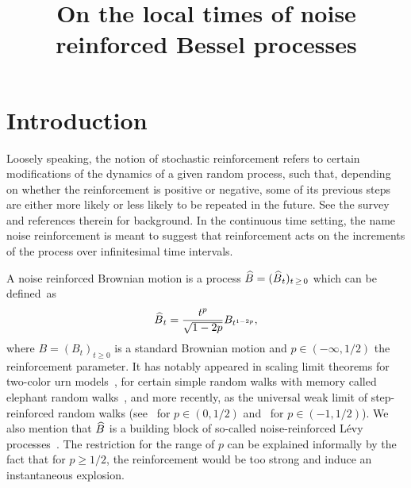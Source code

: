 \documentclass[AHL,Unicode,longabstracts,published]{cedram}
\title[Local time of a noise reinforced Bessel process]{On the local times of noise reinforced Bessel processes}
\author[\initial{J.} \lastname{Bertoin}]{\firstname{Jean} \lastname{Bertoin}}
\renewcommand{\hat}[1]{\widehat{#1}}
\let\oldhat\hat
\renewcommand*{\hat}[1]{\mathchoice{\widehat{#1}}{\widehat{#1}}{\oldhat{#1}}{\oldhat{#1}}}
\begin{document}
\maketitle


\section{Introduction}\label{sec:introduction}
Loosely speaking, the notion of stochastic reinforcement refers to certain modifications of the dynamics of a given random process, such that, depending on whether the reinforcement is positive or negative, some of its previous steps are either more likely or less likely to be repeated in the future. See the survey~\cite{Pem} and references therein for background. In the continuous time setting, the name noise reinforcement is meant to suggest that reinforcement acts on the increments of the process over infinitesimal time intervals.

A noise reinforced Brownian motion is a process $\hat B=(\hat B_t)_{t\,\geq\,0}$ which can be defined~as
\[
\hat B_t = \frac{t^{p}}{\sqrt{1-2p}}{B_{t^{1-2p}}},
\]
where $B=(B_t)_{t\geq 0}$ is a standard Brownian motion and $p\in(-\infty,1/2)$ the reinforcement parameter. It has notably appeared in scaling limit theorems for two-color urn models~\cite{BHZ,Gouet}, for certain simple random walks with memory called elephant random walks~\cite{BaurBer,ColGavSch2}, and more recently, as the universal weak limit of step-reinforced random walks (see~\cite{BerVla} for $p\in(0,1/2)$ and~\cite{BerRos} for $p\in(-1,1/2)$). We also mention that $\hat B$ is a building block of so-called noise-reinforced Lévy processes~\cite{NRLP}. The restriction for the range of $p$ can be explained informally by the fact that for $p\geq 1/2$, the reinforcement would be too strong and induce an instantaneous explosion.
\end{document}
